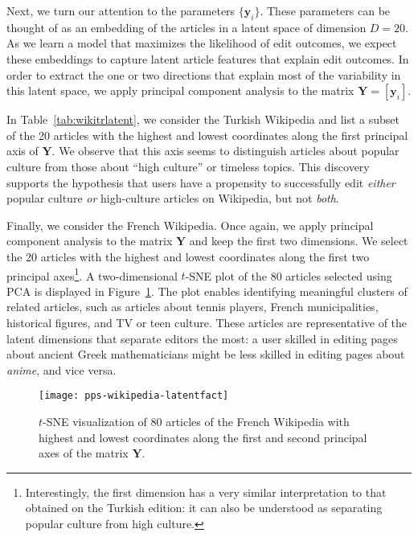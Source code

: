 Next, we turn our attention to the parameters $\{ \bm{y}_i \}$.
These parameters can be thought of as an embedding of the articles in a latent space of dimension $D = 20$.
As we learn a model that maximizes the likelihood of edit outcomes, we expect these embeddings to capture latent article features that explain edit outcomes.
In order to extract the one or two directions that explain most of the variability in this latent space, we apply principal component analysis \citep{bishop2006pattern} to the matrix $\bm{Y} = [\bm{y}_i]$.

In Table~\ref{tab:wikitrlatent}, we consider the Turkish Wikipedia and list a subset of the \num{20} articles with the highest and lowest coordinates along the first principal axis of $\bm{Y}$.
We observe that this axis seems to distinguish articles about popular culture from those about ``high culture'' or timeless topics.
This discovery supports the hypothesis that users have a propensity to successfully edit \emph{either} popular culture \emph{or} high-culture articles on Wikipedia, but not \emph{both}.

Finally, we consider the French Wikipedia.
Once again, we apply principal component analysis to the matrix $\bm{Y}$ and keep the first two dimensions.
We select the \num{20} articles with the highest and lowest coordinates along the first two principal axes\footnote{%
	Interestingly, the first dimension has a very similar interpretation to that obtained on the Turkish edition: it can also be understood as separating popular culture from high culture.}.
A two-dimensional $t$-SNE plot \citep{vandermaaten2008visualizing} of the 80 articles selected using PCA is displayed in Figure~\ref{fig:wikifrlatent}.
The plot enables identifying meaningful clusters of related articles, such as articles about tennis players, French municipalities, historical figures, and TV or teen culture.
These articles are representative of the latent dimensions that separate editors the most:
a user skilled in editing pages about ancient Greek mathematicians might be less skilled in editing pages about \emph{anime}, and vice versa.

\begin{figure}
	\texttt{[image: pps-wikipedia-latentfact]}
	\caption{$t$-SNE visualization of 80 articles of the French Wikipedia with highest and lowest coordinates along the first and second principal axes of the matrix $\bm{Y}$.}
	\label{fig:wikifrlatent}
\end{figure}

